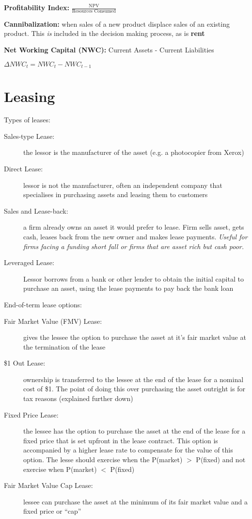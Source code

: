 \documentclass{report}
\begin{document}
\vspace*{1\baselineskip}
\textbf{Profitability Index:} $\frac{\mbox{NPV}}{\mbox{Resources Consumed}}$

\vspace*{1\baselineskip}
\textbf{Cannibalization:} when sales of a new product displace sales of an existing product. This \textit{is} included in the decision making process, as is \textbf{rent}

\textbf{Net Working Capital (NWC):} Current Assets - Current Liabilities

\textbf{$\Delta NWC_t=NWC_t-NWC_{t-1}$}
\newpage
\section{Leasing}
\label{sec:leasing}

Types of leases:
\begin{description}
\item[Sales-type Lease:] the lessor is the manufacturer of the asset (e.g. a photocopier from Xerox)
\item[Direct Lease:] lessor is not the manufacturer, often an independent company that specialises in purchasing assets and leasing them to customers 
\item[Sales and Lease-back:] a firm already owns an asset it would prefer to lease. Firm sells asset, gets cash, leases back from the new owner and makes lease payments. \textit{Useful for firms facing a funding short fall or firms that are asset rich but cash poor.}
\item[Leveraged Lease:] Lessor borrows from a bank or other lender to obtain the initial capital to purchase an asset, using the lease payments to pay back the bank loan  
\end{description}

End-of-term lease options:
\begin{description}
\item[Fair Market Value (FMV) Lease:] gives the lessee the option to purchase the asset at it's fair market value at the termination of the lease
\item[\$1 Out Lease:] ownership is transferred to the lessee at the end of the lease for a nominal cost of \$1. The point of doing this over purchasing the asset outright is for tax reasons (explained further down)
\item[Fixed Price Lease:] the lessee has the option to purchase the asset at the end of the lease for a fixed price that is set upfront in the lease contract. This option is accompanied by a higher lease rate to compensate for the value of this option. The lesse should exercise when the P(market) $>$ P(fixed) and not exercise when P(market) $<$ P(fixed)
\item[Fair Market Value Cap Lease:] lessee can purchase the asset at the minimum of its fair market value and a fixed price or ``cap''  
\end{description}
\end{document}
